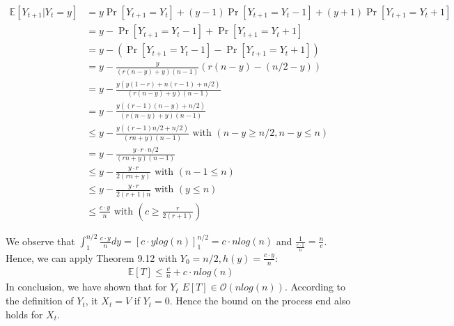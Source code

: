 \documentclass[a4paper,german]{article}
\newcommand{\E}{\mathbb{E}}
\begin{document}
\begin{align*}
	\E[Y_{t+1} | Y_t = y] &= y \Pr[Y_{t+1} = Y_t] + (y-1)\Pr[Y_{t+1} = Y_t - 1] + (y+1)\Pr[Y_{t+1} = Y_t + 1] \\
	&=y - \Pr[Y_{t+1} = Y_t - 1] + \Pr[Y_{t+1} = Y_t + 1] \\
	&=y - (\Pr[Y_{t+1} = Y_t - 1] - \Pr[Y_{t+1} = Y_t + 1]) \\
	&= y -\frac{y}{(r(n-y) +y) (n-1)} (r(n-y) - (n/2 - y)) \\
	&=  y - \frac{y (y(1-r) +n (r-1) + n/2)}{(r(n-y) +y) (n-1)} \\
	&=  y - \frac{y ((r-1)(n-y) + n/2)}{(r(n-y) +y) (n-1)} \\
	&\leq y - \frac{y ((r-1)n/2 + n/2)}{(rn +y) (n-1)} \text{ with } (n-y \geq n/2, n-y \leq n) \\
	&= y - \frac{y \cdot r \cdot n/2}{(rn +y) (n-1)}\\
	&\leq y - \frac{y \cdot r}{2(rn +y)} \text { with } (n-1 \leq n)\\
	&\leq y - \frac{y \cdot r}{2(r+1)n} \text { with } (y \leq n) \\
	&\leq \frac{c \cdot y}{n} \text { with } (c \geq \frac{r}{2(r+1)})
\end{align*}

We observe that \( \int_1^{n/2} \frac{c \cdot y}{n} dy =  \left[ c\cdot y log(n)\right]_1^{n/2} = c\cdot n log(n)\) and \(\frac{1}{\frac{c \cdot 1}{n}} = \frac{n}{c}\). Hence, we can apply Theorem 9.12 with \(Y_0 = n/2, h(y) = \frac{c \cdot y}{n}\):
\begin{align*}
	\E[T] \leq \frac{c}{n} + c\cdot n log(n)
\end{align*} 
In conclusion, we have shown that for \(Y_t\) \(E[T] \in \mathcal{O}(nlog(n))\). According to the definition of \(Y_t\), it \(X_t = V\) if \(Y_t = 0\). Hence the bound on the process end also holds for \(X_t\).
\end{document}
